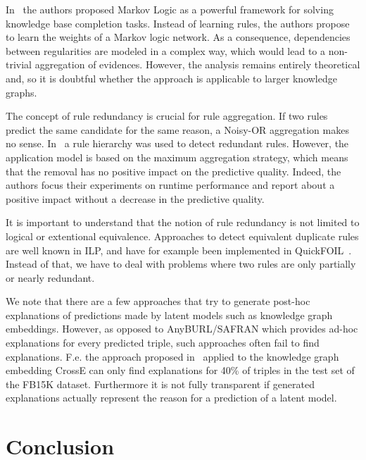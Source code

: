 \documentclass[akbc,twoside,11pt,lettersize]{article}
\begin{document}
In~\cite{pmlr-v115-kuzelka20a} the authors proposed Markov Logic as a powerful framework for solving knowledge base completion tasks. Instead of learning rules, the authors propose to learn the weights of a Markov logic network. As a consequence, dependencies between regularities are modeled in a complex way, which would lead to a non-trivial aggregation of evidences. However, the analysis remains entirely theoretical and, so it is doubtful whether the approach is applicable to larger knowledge graphs.

The concept of rule redundancy is crucial for rule aggregation. If two rules predict the same candidate for the same reason, a Noisy-OR aggregation makes no sense. In~\cite{gu2020building} a rule hierarchy was used to detect redundant rules. However, the application model is based on the maximum aggregation strategy, which means that the removal has no positive impact on the predictive quality. Indeed, the authors focus their experiments on runtime performance and report about a positive impact without a decrease in the predictive quality. 


It is important to understand that the notion of rule redundancy is not limited to logical or extentional equivalence. Approaches to detect equivalent duplicate rules are well known in ILP, and have for example been implemented in QuickFOIL~\cite{zeng2014quickfoil}. Instead of that, we have to deal with problems where two rules are only partially or nearly redundant. 


We note that there are a few approaches that try to generate post-hoc explanations of predictions made by latent models such as knowledge graph embeddings. However, as opposed to AnyBURL/SAFRAN which provides ad-hoc explanations for every predicted triple, such approaches often fail to find explanations. F.e. the approach proposed in~\cite{Crosse} applied to the knowledge graph embedding CrossE can only find explanations for 40\% of triples in the test set of the FB15K dataset. Furthermore it is not fully transparent if generated explanations actually represent the reason for a prediction of a latent model.

\section{Conclusion}
\end{document}
